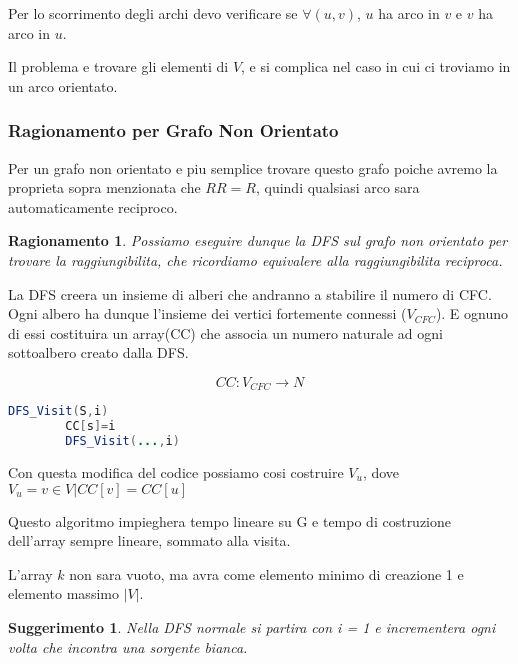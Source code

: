 Per lo scorrimento degli archi devo verificare se $\forall(u,v)$, $u$ ha arco in $v$ e $v$ ha arco in $u$.

Il problema e trovare gli elementi di $V$, e si complica nel caso in cui ci troviamo in un arco orientato.

\subsubsection{Ragionamento per Grafo Non Orientato}
Per un grafo non orientato e piu semplice trovare questo grafo poiche avremo la proprieta sopra menzionata che $RR = R$, quindi qualsiasi arco sara automaticamente reciproco.

\newtheorem{ragnonorientato}{Ragionamento}

\begin{ragnonorientato}
	Possiamo eseguire dunque la DFS sul grafo non orientato per trovare la raggiungibilita, che ricordiamo equivalere alla raggiungibilita reciproca.
\end{ragnonorientato}

La DFS creera un insieme di alberi che andranno a stabilire il numero di CFC.
Ogni albero ha dunque l'insieme dei vertici fortemente connessi ($V_{CFC}$). E ognuno di essi costituira un array(CC) che associa un numero naturale ad ogni sottoalbero creato dalla DFS.

$$CC : V_{CFC} \rightarrow N$$


\begin{lstlisting}[language=Java]
	DFS_Visit(S,i)
		CC[s]=i
		DFS_Visit(...,i)
\end{lstlisting}

Con questa modifica del codice possiamo cosi costruire $V_{u}$, dove $V_u = {v \in V | CC[v] = CC[u]}$


Questo algoritmo impieghera tempo lineare su G e tempo di costruzione dell'array sempre lineare, sommato alla visita.

L'array $k$ non sara vuoto, ma avra come elemento minimo di creazione 1 e elemento massimo $|V|$.

\newtheorem{consCFCnonorientato}{Suggerimento}

\begin{consCFCnonorientato}
	Nella DFS normale si partira con i = 1 e incrementera ogni volta che incontra una sorgente bianca.
\end{consCFCnonorientato}


